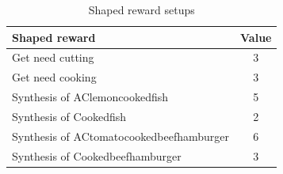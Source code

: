 \begin{table}[htb]
\centering
\caption{Shaped reward setups}
\label{tab:shaped reward}
\setlength{\tabcolsep}{3.5mm}
\begin{tabular}{lc}
\toprule
\textbf{Shaped reward} & \textbf{Value} \\
\midrule
Get need cutting  & 3    \\
Get need cooking  & 3    \\
Synthesis of AClemoncookedfish & 5  \\
Synthesis of Cookedfish & 2  \\
Synthesis of ACtomatocookedbeefhamburger & 6  \\
Synthesis of Cookedbeefhamburger        & 3     \\
\bottomrule
\end{tabular}
\end{table}

